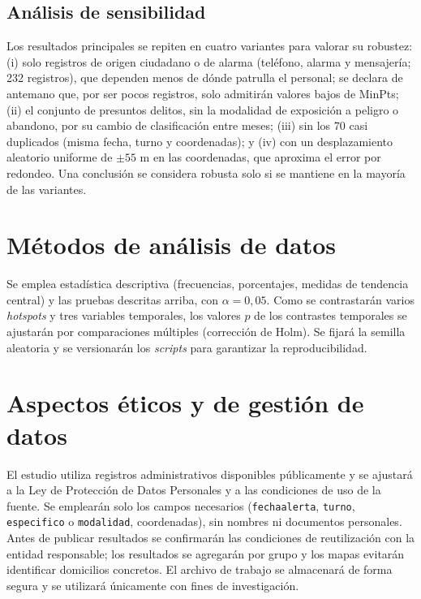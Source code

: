 \subsection{Análisis de sensibilidad}
\label{sec:sensibilidad}

Los resultados principales se repiten en cuatro variantes para valorar su robustez: (i) solo registros de origen ciudadano o de alarma (teléfono, alarma y mensajería; 232 registros), que dependen menos de dónde patrulla el personal; se declara de antemano que, por ser pocos registros, solo admitirán valores bajos de MinPts; (ii) el conjunto de presuntos delitos, sin la modalidad de exposición a peligro o abandono, por su cambio de clasificación entre meses; (iii) sin los 70 casi duplicados (misma fecha, turno y coordenadas); y (iv) con un desplazamiento aleatorio uniforme de $\pm 55$ m en las coordenadas, que aproxima el error por redondeo. Una conclusión se considera robusta solo si se mantiene en la mayoría de las variantes.

\section{Métodos de análisis de datos}

Se emplea estadística descriptiva (frecuencias, porcentajes, medidas de tendencia central) y las pruebas descritas arriba, con $\alpha = 0{,}05$. Como se contrastarán varios \textit{hotspots} y tres variables temporales, los valores $p$ de los contrastes temporales se ajustarán por comparaciones múltiples (corrección de Holm). Se fijará la semilla aleatoria y se versionarán los \textit{scripts} para garantizar la reproducibilidad.

\section{Aspectos éticos y de gestión de datos}

El estudio utiliza registros administrativos disponibles públicamente y se ajustará a la Ley de Protección de Datos Personales y a las condiciones de uso de la fuente. Se emplearán solo los campos necesarios (\texttt{fechaalerta}, \texttt{turno}, \texttt{especifico} o \texttt{modalidad}, coordenadas), sin nombres ni documentos personales. Antes de publicar resultados se confirmarán las condiciones de reutilización con la entidad responsable; los resultados se agregarán por grupo y los mapas evitarán identificar domicilios concretos. El archivo de trabajo se almacenará de forma segura y se utilizará únicamente con fines de investigación.
